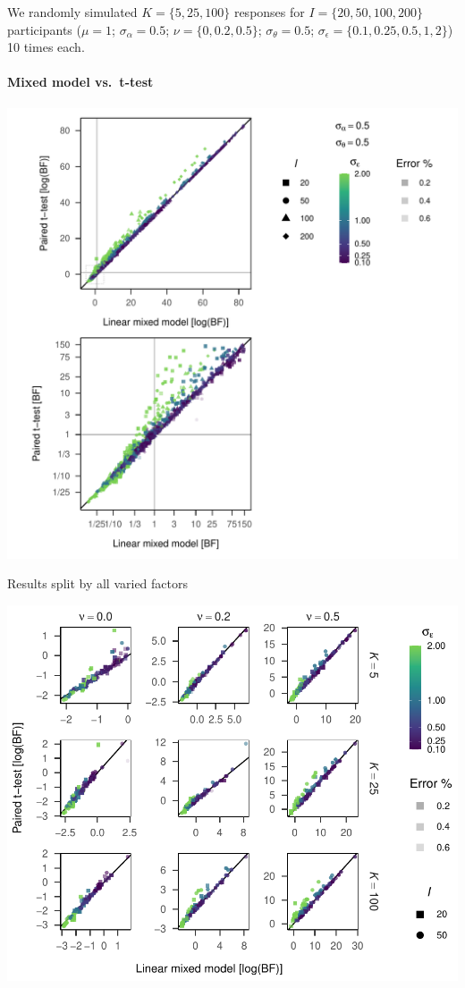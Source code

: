 \documentclass[
  a4paper,
  DIV=11,
  numbers=noendperiod,
  oneside]{scrartcl}
\let\oldparagraph\paragraph
\renewcommand{\paragraph}[1]{\oldparagraph{#1}\mbox{}}
\begin{document}
We randomly simulated \(K = \{5, 25, 100\}\) responses for
\(I = \{20, 50, 100, 200\}\) participants (\(\mu = 1\);
\(\sigma_\alpha = 0.5\); \(\nu = \{0, 0.2, 0.5\}\);
\(\sigma_\theta = 0.5\); \(\sigma_\epsilon = \{0.1, 0.25, 0.5, 1, 2\}\))
10 times each.

\hypertarget{mixed-model-vs.-t-test}{%
\paragraph{Mixed model vs.~t-test}\label{mixed-model-vs.-t-test}}

\includegraphics{prior_translation_files/figure-pdf/simulation-results1-1.pdf}

Results split by all varied factors

\includegraphics{prior_translation_files/figure-pdf/simulation-results1-details-1.pdf}
\end{document}
